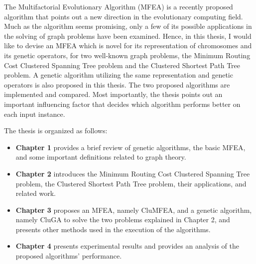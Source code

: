 \fontsize{12}{16}\selectfont

The Multifactorial Evolutionary Algorithm (MFEA) is a recently proposed algorithm that points out a new direction in the evolutionary computing field. Much as the algorithm seems promising, only a few of its possible applications in the solving of graph problems have been examined. Hence, in this thesis, I would like to devise an MFEA which is novel for its representation of chromosomes and its genetic operators, for two well-known graph problems, the Minimum Routing Cost Clustered Spanning Tree problem and the Clustered Shortest Path Tree problem. A genetic algorithm utilizing the same representation and genetic operators is also proposed in this thesis. The two proposed algorithms are implemented and compared. Most importantly, the thesis points out an important influencing factor that decides which algorithm performs better on each input instance.

The thesis is organized as follows:

\begin{itemize}
	\item \textbf{Chapter 1}  provides a brief review of genetic algorithms, the basic MFEA, and some important definitions related to graph theory.
	\item \textbf{Chapter 2} introduces the Minimum Routing Cost Clustered Spanning Tree problem, the Clustered Shortest Path Tree problem, their applications, and related work.
	\item \textbf{Chapter 3} proposes an MFEA, namely CluMFEA, and a genetic algorithm, namely CluGA to solve the two problems explained in Chapter 2, and presents other methods used in the execution of the algorithms.
	\item \textbf{Chapter 4} presents experimental results and provides an analysis of the proposed algorithms' performance.
\end{itemize}